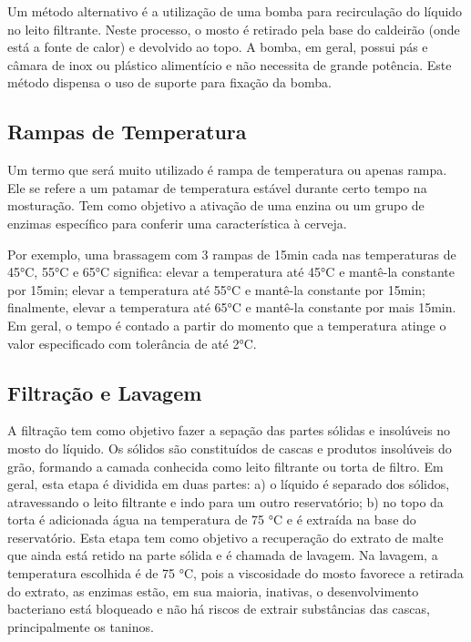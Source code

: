 Um método alternativo é a utilização de uma bomba para recirculação do líquido no leito filtrante. Neste processo, o mosto é retirado pela base do caldeirão (onde está a fonte de calor) e devolvido ao topo. A bomba, em geral, possui pás e câmara de inox ou plástico alimentício e não necessita de grande potência. Este método dispensa o uso de suporte para fixação da bomba. 

	\subsection{Rampas de Temperatura}
Um termo que será muito utilizado é rampa de temperatura ou apenas rampa. Ele se refere a um patamar de temperatura estável durante certo tempo na mosturação. Tem como objetivo a ativação de uma enzina ou um grupo de enzimas específico para conferir uma característica à cerveja.

Por exemplo, uma brassagem com 3 rampas de 15min cada nas temperaturas de 45°C, 55°C e 65°C significa: elevar a temperatura até 45°C e mantê-la constante por 15min; elevar a temperatura até 55°C e mantê-la constante por 15min; finalmente, elevar a temperatura até 65°C e mantê-la constante por mais 15min. Em geral, o tempo é contado a partir do momento que a temperatura atinge o valor especificado com tolerância de até 2°C.


				\subsection{Filtração e Lavagem}
A filtração tem como objetivo fazer a sepação das partes sólidas e insolúveis no mosto do líquido. Os sólidos são constituídos de cascas e produtos insolúveis do grão, formando a camada conhecida como leito filtrante ou torta de filtro.  Em geral, esta etapa é dividida em duas partes: a) o líquido é separado dos sólidos, atravessando o leito filtrante e indo para um outro reservatório; b) no topo da torta é adicionada água na temperatura de 75 °C e é extraída na base do reservatório. Esta etapa tem como objetivo a recuperação do extrato de malte que ainda está retido na parte sólida e é chamada de lavagem. Na lavagem, a temperatura escolhida é de 75 °C, pois a viscosidade do mosto favorece a retirada do extrato, as enzimas estão, em sua maioria, inativas, o desenvolvimento bacteriano está bloqueado e não há riscos de extrair substâncias das cascas, principalmente os taninos. 

